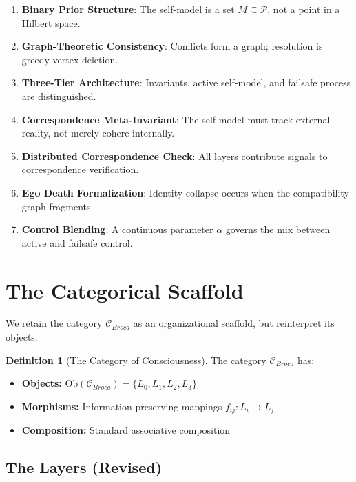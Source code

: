 \documentclass[12pt,a4paper]{article}
\theoremstyle{definition}
\newtheorem{definition}{Definition}[section]
\begin{document}
\begin{enumerate}[label=(\roman*)]
    \item \textbf{Binary Prior Structure}: The self-model is a set $M \subseteq \mathcal{P}$, not a point in a Hilbert space.
    \item \textbf{Graph-Theoretic Consistency}: Conflicts form a graph; resolution is greedy vertex deletion.
    \item \textbf{Three-Tier Architecture}: Invariants, active self-model, and failsafe process are distinguished.
    \item \textbf{Correspondence Meta-Invariant}: The self-model must track external reality, not merely cohere internally.
    \item \textbf{Distributed Correspondence Check}: All layers contribute signals to correspondence verification.
    \item \textbf{Ego Death Formalization}: Identity collapse occurs when the compatibility graph fragments.
    \item \textbf{Control Blending}: A continuous parameter $\alpha$ governs the mix between active and failsafe control.
\end{enumerate}

\section{The Categorical Scaffold}

We retain the category $\mathcal{C}_{Broca}$ as an organizational scaffold, but reinterpret its objects.

\begin{definition}[The Category of Consciousness]
The category $\mathcal{C}_{Broca}$ has:
\begin{itemize}
    \item \textbf{Objects:} $\mathrm{Ob}(\mathcal{C}_{Broca}) = \{L_0, L_1, L_2, L_3\}$
    \item \textbf{Morphisms:} Information-preserving mappings $f_{ij}: L_i \to L_j$
    \item \textbf{Composition:} Standard associative composition
\end{itemize}
\end{definition}

\subsection{The Layers (Revised)}
\end{document}
